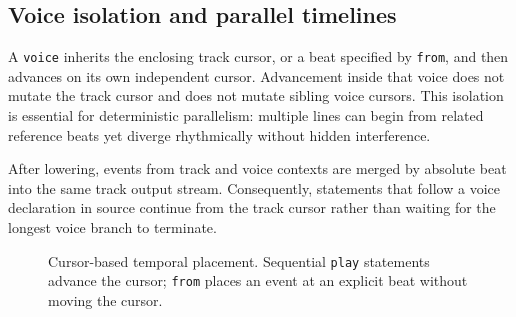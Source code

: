 \subsection{Voice isolation and parallel timelines}

A \texttt{voice} inherits the enclosing track cursor, or a beat specified by \texttt{from}, and then advances on its own
independent cursor.
Advancement inside that voice does not mutate the track cursor and does not mutate sibling voice cursors.
This isolation is essential for deterministic parallelism:
multiple lines can begin from related reference beats yet diverge rhythmically without hidden interference.

After lowering, events from track and voice contexts are merged by absolute beat into the same track output stream.
Consequently, statements that follow a voice declaration in source continue from the track cursor rather than
waiting for
the longest voice branch to terminate.

\begin{figure}[htbp]
  \centering
  \caption{Cursor-based temporal placement.
    Sequential \texttt{play} statements advance the cursor; \texttt{from} places an event at an explicit beat without
  moving the cursor.}\label{fig:cursor-model}
\end{figure}
